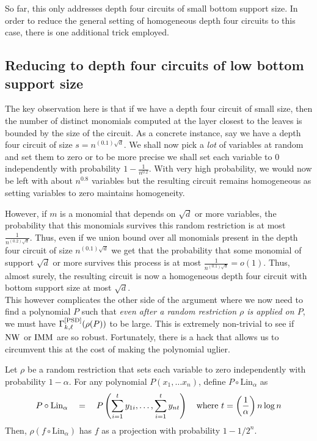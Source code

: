 So far, this only addresses depth four circuits of small bottom support size. In order to reduce the general setting of homogeneous depth four circuits to this case, there is one additional trick employed. 

\subsection{Reducing  to depth four circuits of low bottom support size}

The key observation here is that if we have a depth four circuit of small size, then the number of distinct monomials computed at the layer closest to the leaves is bounded by the size of the circuit.
As a concrete instance, say we have a depth four circuit of size $s = n^{(0.1) \sqrt{d}}$.
We shall now pick a \emph{lot} of variables at random and set them to zero or to be more precise we shall set each variable to $0$ independently with probability $1 - \frac{1}{n^{0.2}}$. With very high probability, we would now be left with about $n^{0.8}$ variables but the resulting circuit remains homogeneous as setting variables to zero maintains homogeneity. 

However, if $m$ is a monomial that depends on $\sqrt{d}$ or more variables, the probability that this monomials survives this random restriction is at most $\frac{1}{n^{(0.2) \sqrt{d}}}$. Thus, even if we union bound over all monomials present in the depth four circuit of size $n^{(0.1)\sqrt{d}}$ we get
that the probability that some monomial of support $\sqrt{d}$ or more survives this process is at most $\frac{1}{n^{(0.1)\sqrt{d}}} = o(1)$. Thus, almost surely, the resulting circuit is now a homogeneous depth four circuit with bottom support size at most $\sqrt{d}$. \\

This however complicates the other side of the argument where we now need to find a polynomial $P$ such that \emph{even after a random restriction $\rho$ is applied on $P$}, we must have $\Gamma^{\mathrm{[PSD]}}_{k,\ell}(\rho(P))$ to be large. This is extremely non-trivial to see if $\operatorname{\mathrm{NW}}$ or $\operatorname{\mathrm{IMM}}$ are so robust. Fortunately, there is a hack that allows us to circumvent this at the cost of making the polynomial uglier. 

\begin{lemma*}
Let $\rho$ be a random restriction that sets each variable to zero independently with probability $1 - \alpha$. 
For any polynomial $P(x_1,\dots x_n)$, define $P \circ \mathrm{Lin}_\alpha$ as
\[
P \circ \mathrm{Lin}_\alpha \quad = \quad P\left(\sum_{i=1}^t y_{1i}, \ldots, \sum_{i=1}^t y_{nt}\right)\quad \text{where $t = \left(\frac{1}{\alpha}\right) n \log n$}
\]
Then, $\rho(f \circ \mathrm{Lin}_\alpha)$ has $f$ as a projection with probability $1 - 1/2^{n}$. 
\end{lemma*}

